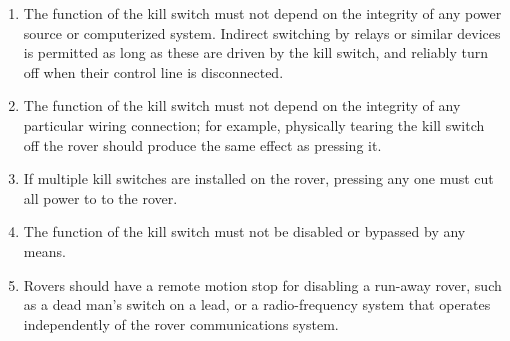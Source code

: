 \begin{enumerate}
\begin{enumerate}
        \item The function of the kill switch must not depend on the integrity of any power source or computerized system. Indirect switching by relays or similar devices is permitted as long as these are driven by the kill switch, and reliably turn off when their control line is disconnected.
        \item The function of the kill switch must not depend on the integrity of any particular wiring connection; for example, physically tearing the kill switch off the rover should produce the same effect as pressing it.
        \item If multiple kill switches are installed on the rover, pressing any one must cut all power to to the rover.
        \item The function of the kill switch must not be disabled or bypassed by any means.
        \item Rovers should have a remote motion stop for disabling a run-away rover, such as a dead man’s switch on a lead, or a radio-frequency system that operates independently of the rover communications system.
    \end{enumerate}
    
\end{enumerate}




